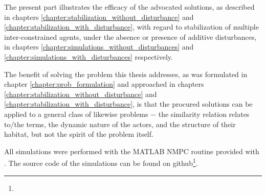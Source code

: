 The present part illustrates the efficacy of the advocated solutions, as
described in chapters \ref{chapter:stabilization_without_disturbance} and
\ref{chapter:stabilization_with_disturbance}, with regard to stabilization
of multiple inter-constrained agents, under the absence or presence
of additive disturbances, in chapters
\ref{chapter:simulations_without_disturbances} and
\ref{chapter:simulations_with_disturbances} respectively.

The benefit of solving the problem this thesis addresses, as was formulated in
chapter \ref{chapter:prob_formulation} and approached in chapters
\ref{chapter:stabilization_without_disturbance} and
\ref{chapter:stabilization_with_disturbance}, is that the procured solutions can
be applied to a general class of likewise problems $-$ the similarity relation
relates to/the terms, the dynamic nature of the actors, and the structure of
their habitat, but not the spirit of the problem itself.

All simulations were performed with the MATLAB NMPC routine provided with
\cite{grune2016nonlinear}. The source code of the simulations can be found on
github\footnote{\githuburl}.\\[2.5ex]
